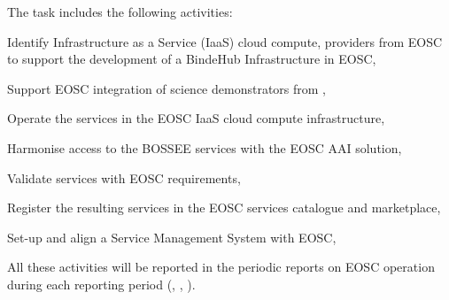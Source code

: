 \begin{task}[
  title=Integration with EOSC,
  id=eosc,
  lead=EGI,
  PM=24,
  wphases={12-48!.7},
  partners={SRL,WTT,XFEL}
]
  The task includes the following activities:
  \begin{compactitem}
  \item Identify Infrastructure as a Service (IaaS) cloud compute,
    providers from EOSC to support the development of a BindeHub
    Infrastructure in EOSC,
  \item Support EOSC integration of science demonstrators from ,
  \item Operate the services in the EOSC IaaS cloud compute infrastructure,
  \item Harmonise access to the BOSSEE services with the EOSC AAI solution,
  \item Validate services with EOSC requirements,
  \item Register the resulting services in the EOSC services catalogue and marketplace,
  \item Set-up and align a Service Management System with EOSC,
  \end{compactitem}

   All these activities will be reported in the periodic reports on EOSC operation
   during each reporting period (, , ).
\end{task}
